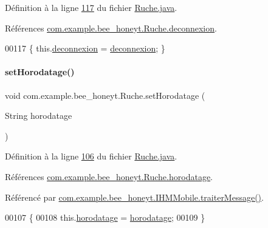 Définition à la ligne \hyperlink{_ruche_8java_source_l00117}{117} du fichier \hyperlink{_ruche_8java_source}{Ruche.\+java}.



Références \hyperlink{_ruche_8java_source_l00022}{com.\+example.\+bee\+\_\+honeyt.\+Ruche.\+deconnexion}.


\begin{DoxyCode}
00117 \{ this.\hyperlink{classcom_1_1example_1_1bee__honeyt_1_1_ruche_a91168fb786c93a5233138f67b6a121ad}{deconnexion} = \hyperlink{classcom_1_1example_1_1bee__honeyt_1_1_ruche_a91168fb786c93a5233138f67b6a121ad}{deconnexion}; \}
\end{DoxyCode}
\mbox{\label{classcom_1_1example_1_1bee__honeyt_1_1_ruche_aff1e1caa39a1d012b1714df3902941f8}} 
\paragraph{\texorpdfstring{set\+Horodatage()}{setHorodatage()}}
{\footnotesize\ttfamily void com.\+example.\+bee\+\_\+honeyt.\+Ruche.\+set\+Horodatage (\begin{DoxyParamCaption}\item[{String}]{horodatage }\end{DoxyParamCaption})}



Définition à la ligne \hyperlink{_ruche_8java_source_l00106}{106} du fichier \hyperlink{_ruche_8java_source}{Ruche.\+java}.



Références \hyperlink{_ruche_8java_source_l00020}{com.\+example.\+bee\+\_\+honeyt.\+Ruche.\+horodatage}.



Référencé par \hyperlink{_i_h_m_mobile_8java_source_l00374}{com.\+example.\+bee\+\_\+honeyt.\+I\+H\+M\+Mobile.\+traiter\+Message()}.


\begin{DoxyCode}
00107     \{
00108         this.\hyperlink{classcom_1_1example_1_1bee__honeyt_1_1_ruche_a93b3665d844cbba761ebf9a19a1d7d34}{horodatage} = \hyperlink{classcom_1_1example_1_1bee__honeyt_1_1_ruche_a93b3665d844cbba761ebf9a19a1d7d34}{horodatage};
00109     \}
\end{DoxyCode}
\mbox{\label{classcom_1_1example_1_1bee__honeyt_1_1_ruche_a8ed5f5c7ede5ca2172306b91a0b6c9b7}} 
